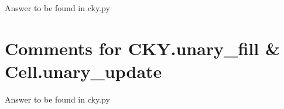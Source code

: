 \documentclass{article}
\begin{document}
%	
%	
Answer to be found in cky.py


\section{Comments for CKY.unary\_fill \& Cell.unary\_update}
%	
%			
%	   
Answer to be found in cky.py
\end{document}
